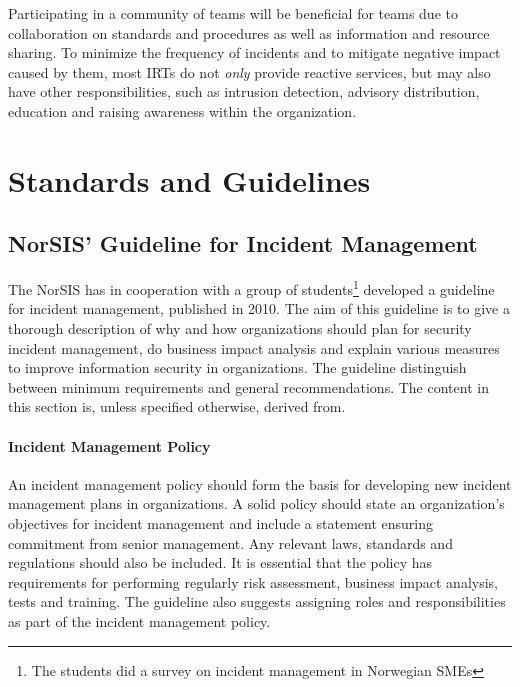Participating in a community of teams will be beneficial for teams due to collaboration on standards and procedures as well as information and resource sharing. To minimize the frequency of incidents and to mitigate negative impact caused by them, most \acp{IRT} do not \emph{only} provide reactive services, but may also have other responsibilities, such as intrusion detection, advisory distribution, education and raising awareness within the organization\cite{nist800-61}.  
  

\section{Standards and Guidelines}







\subsection{NorSIS' Guideline for Incident Management}
The \ac{NorSIS} has in cooperation with a group of students\footnote{The students did a survey on incident management in Norwegian \acsp{SME}\cite{sand2010hendelseshaandtering}} developed a guideline for incident management, published in 2010\cite{norsisveiledning}. The aim of this guideline is to give a thorough description of why and how organizations should plan for security incident management, do business impact analysis and explain various measures to improve information security in organizations. The guideline distinguish between minimum requirements and general recommendations. The content in this section is, unless specified otherwise, derived from\cite{norsisveiledning}.

\paragraph{Incident Management Policy} 
An incident management policy should form the basis for developing new incident management plans in organizations. A solid policy should state an organization's objectives for incident management and include a statement ensuring commitment from senior management. Any relevant laws, standards and regulations should also be included. It is essential that the policy has requirements for performing regularly risk assessment, business impact analysis, tests and training. The guideline also suggests assigning roles and responsibilities as part of the incident management policy.

